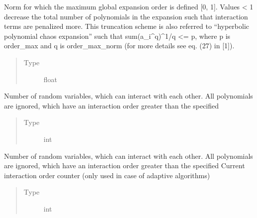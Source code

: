 \documentclass[letterpaper,10pt,english,openany,oneside]{sphinxmanual}
\begin{document}
\begin{fulllineitems}
\begin{fulllineitems}
\label{\detokenize{pygpc:pygpc.SGPC.SGPC.order_max_norm}}
Norm for which the maximum global expansion order is defined {[}0, 1{]}. Values \textless{} 1 decrease the total number
of polynomials in the expansion such that interaction terms are penalized more. This truncation scheme
is also referred to “hyperbolic polynomial chaos expansion” such that sum(a\_i\textasciicircum{}q)\textasciicircum{}1/q \textless{}= p,
where p is order\_max and q is order\_max\_norm (for more details see eq. (27) in {[}1{]}).
\begin{quote}\begin{description}
\item[{Type}] \leavevmode
float

\end{description}\end{quote}

\end{fulllineitems}


\begin{fulllineitems}
\label{\detokenize{pygpc:pygpc.SGPC.SGPC.interaction_order}}
Number of random variables, which can interact with each other.
All polynomials are ignored, which have an interaction order greater than the specified
\begin{quote}\begin{description}
\item[{Type}] \leavevmode
int

\end{description}\end{quote}

\end{fulllineitems}


\begin{fulllineitems}
\label{\detokenize{pygpc:pygpc.SGPC.SGPC.interaction_order_current}}
Number of random variables, which can interact with each other.
All polynomials are ignored, which have an interaction order greater than the specified
Current interaction order counter (only used in case of adaptive algorithms)
\begin{quote}\begin{description}
\item[{Type}] \leavevmode
int


\end{description}
\end{quote}
\end{fulllineitems}
\end{fulllineitems}
\end{document}
